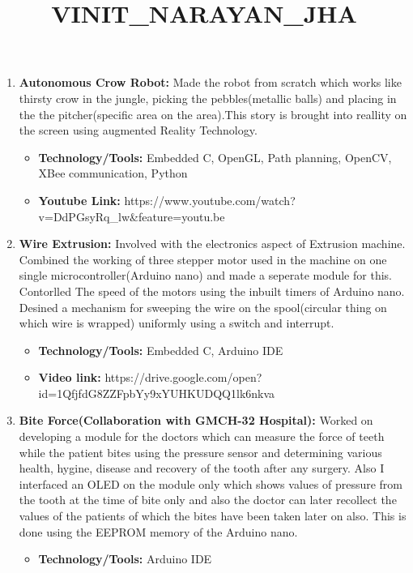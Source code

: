 \documentclass[letterpaper,11pt]{article}
\title{VINIT_NARAYAN_JHA}
\newlength{\outerbordwidth}
\newcommand{\resheading}[1]{\vspace{8pt}
  \parbox{\textwidth}{\setlength{\FrameSep}{\outerbordwidth}
    \begin{shaded}
\setlength{\fboxsep}{0pt}\framebox[\textwidth][l]{\setlength{\fboxsep}{4pt}\fcolorbox{shadecolorB}{shadecolorB}{\textbf{\sffamily{\mbox{~}\makebox[6.762in][l]{\large #1} \vphantom{p\^{E}}}}}}
    \end{shaded}
  }\vspace{-5pt}
}
\begin{document}
\resheading{Projects}
 \begin{enumerate}

\item \textbf {Autonomous Crow Robot:}
Made the robot from scratch which works like thirsty crow in the jungle, picking the pebbles(metallic balls) and placing in the the pitcher(specific area on the area).This story is brought into reallity on the screen using augmented Reality Technology. 
\begin{itemize}
\item \textbf{Technology/Tools:} Embedded C, OpenGL, Path planning, OpenCV, XBee communication, Python 
\end{itemize}
\begin{itemize}
\item \textbf{Youtube Link:} https://www.youtube.com/watch?v=DdPGsyRq_lw&feature=youtu.be
\end{itemize}

\item \textbf {Wire Extrusion:}
Involved with the electronics aspect of Extrusion machine. Combined the working of three stepper motor used in the machine on one single microcontroller(Arduino nano) and made a seperate module for this. Contorlled The speed of the motors using the inbuilt timers of Arduino nano. Desined a mechanism for sweeping the wire on the spool(circular thing on which wire is wrapped) uniformly using a switch and interrupt. 

\begin{itemize}
\item \textbf{Technology/Tools:} Embedded C, Arduino IDE
\end{itemize}
\begin{itemize}
\item \textbf{Video link:} https://drive.google.com/open?id=1QfjfdG8ZZFpbYy9xYUHKUDQQ1lk6nkva
\end{itemize}

 
  \item \textbf{Bite Force(Collaboration with GMCH-32 Hospital):} 
Worked on developing a module for the doctors which can measure the force of teeth while the patient bites using the pressure sensor and determining various health, hygine, disease and recovery of the tooth after any surgery. Also I interfaced an OLED on the module only which shows values of pressure from the tooth at the time of bite only and also the doctor can later recollect the values of the patients of which the bites have been taken later on also. This is done using the EEPROM memory of the Arduino nano.
\begin{itemize}
\item \textbf{Technology/Tools:} Arduino IDE
\end{itemize}


\end{enumerate}
\end{document}
